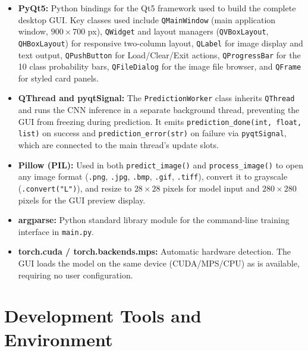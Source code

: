 \documentclass[12pt,a4paper,openany]{report}
\begin{document}
\begin{itemize}
    \item \textbf{PyQt5:} Python bindings for the Qt5 framework used to build the complete desktop GUI. Key classes used include \texttt{QMainWindow} (main application window, $900 \times 700$ px), \texttt{QWidget} and layout managers (\texttt{QVBoxLayout}, \texttt{QHBoxLayout}) for responsive two-column layout, \texttt{QLabel} for image display and text output, \texttt{QPushButton} for Load/Clear/Exit actions, \texttt{QProgressBar} for the 10 class probability bars, \texttt{QFileDialog} for the image file browser, and \texttt{QFrame} for styled card panels.
    \item \textbf{QThread and pyqtSignal:} The \texttt{PredictionWorker} class inherits \texttt{QThread} and runs the CNN inference in a separate background thread, preventing the GUI from freezing during prediction. It emits \texttt{prediction\_done(int, float, list)} on success and \texttt{prediction\_error(str)} on failure via \texttt{pyqtSignal}, which are connected to the main thread's update slots.
    \item \textbf{Pillow (PIL):} Used in both \texttt{predict\_image()} and \texttt{process\_image()} to open any image format (\texttt{.png}, \texttt{.jpg}, \texttt{.bmp}, \texttt{.gif}, \texttt{.tiff}), convert it to grayscale (\texttt{.convert("L")}), and resize to $28 \times 28$ pixels for model input and $280 \times 280$ pixels for the GUI preview display.
    \item \textbf{argparse:} Python standard library module for the command-line training interface in \texttt{main.py}.
    \item \textbf{torch.cuda / torch.backends.mps:} Automatic hardware detection. The GUI loads the model on the same device (CUDA/MPS/CPU) as is available, requiring no user configuration.
\end{itemize}

\section{Development Tools and Environment}
\end{document}
